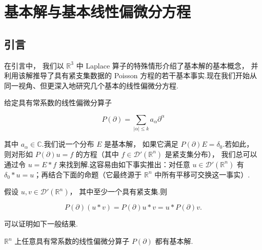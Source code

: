 
\chapter{基本解与基本线性偏微分方程}

\section*{引言}

在引言中， 我们以 $\mathbb{R}^{3}$ 中 Laplace 算子的特殊情形介绍了基本解的基本概念， 并利用该解推导了具有紧支集数据的 Poisson 方程的若干基本事实.现在我们开始从同一视角、但更深入地研究几个基本的线性偏微分方程.

给定具有常系数的线性偏微分算子

\[
P(\partial) = \sum_{|\alpha| \leq k} a_{\alpha}\partial^{\alpha}
\]

其中 $a_{\alpha} \in \mathbb{C}$.我们说一个分布 $E$ 是基本解， 如果它满足 $P(\partial)E = \delta_{0}$.若如此， 则对形如 $P(\partial)u = f$ 的方程（其中 $f \in \mathcal{D}'(\mathbb{R}^{n})$ 是紧支集分布）， 我们总可以通过令 $u = E*f$ 来找到解.这容易由如下事实推出：对任意 $u \in \mathcal{D}'(\mathbb{R}^{n})$ 有 $\delta_{0}*u = u$；再结合下面的命题（它最终源于 $\mathbb{R}^{n}$ 中所有平移可交换这一事实）.

\setcounter{mtthm}{2}
\begin{proposition}\label{prop:c4-0.3}
假设 $u, v \in \mathcal{D}'(\mathbb{R}^{n})$， 其中至少一个具有紧支集.则

\[
P(\partial)(u*v) = P(\partial)u*v = u*P(\partial)v.
\]
\end{proposition}

可以证明如下一般结果.

\begin{theorem}\label{thm:c4-0.4}
$\mathbb{R}^{n}$ 上任意具有常系数的线性偏微分算子 $P(\partial)$ 都有基本解.
\end{theorem}

